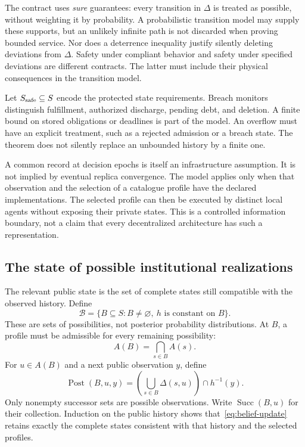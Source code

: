 \documentclass[11pt,letterpaper]{article}
\theoremstyle{plain}
\theoremstyle{definition}
\theoremstyle{remark}
\begin{document}
The contract uses \emph{sure} guarantees: every transition in $\Delta$ is treated as possible, without weighting it by probability. A probabilistic transition model may supply these supports, but an unlikely infinite path is not discarded when proving bounded service. Nor does a deterrence inequality justify silently deleting deviations from $\Delta$. Safety under compliant behavior and safety under specified deviations are different contracts. The latter must include their physical consequences in the transition model.

Let $S_{\rm safe}\subseteq S$ encode the protected state requirements. Breach monitors distinguish fulfillment, authorized discharge, pending debt, and deletion. A finite bound on stored obligations or deadlines is part of the model. An overflow must have an explicit treatment, such as a rejected admission or a breach state. The theorem does not silently replace an unbounded history by a finite one.

A common record at decision epochs is itself an infrastructure assumption. It is not implied by eventual replica convergence. The model applies only when that observation and the selection of a catalogue profile have the declared implementations. The selected profile can then be executed by distinct local agents without exposing their private states. This is a controlled information boundary, not a claim that every decentralized architecture has such a representation.

\subsection{The state of possible institutional realizations}
The relevant public state is the set of complete states still compatible with the observed history. Define
\[
\mathcal B=\{B\subseteq S:B\ne\varnothing,\ h\text{ is constant on }B\}.
\]
These are sets of possibilities, not posterior probability distributions. At $B$, a profile must be admissible for every remaining possibility:
\[
A(B)=\bigcap_{s\in B}A(s).
\]
For $u\in A(B)$ and a next public observation $y$, define
\begin{equation}\label{eq:belief-update}
\operatorname{Post}(B,u,y)=
\left(\bigcup_{s\in B}\Delta(s,u)\right)\cap h^{-1}(y).
\end{equation}
Only nonempty successor sets are possible observations. Write $\operatorname{Succ}(B,u)$ for their collection. Induction on the public history shows that~\eqref{eq:belief-update} retains exactly the complete states consistent with that history and the selected profiles.
\end{document}
